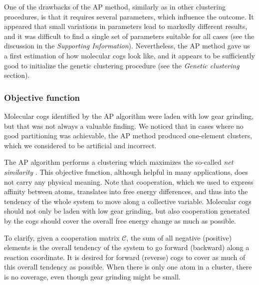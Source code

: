 \documentclass[a4paper,11pt,twoside]{book}%
\begin{document}
One of the drawbacks of the AP method, similarly as in other clustering procedures, is that it requires several parameters, which influence the outcome.
It appeared that small variations in parameters lead to markedly different results, and it was difficult to find a single set of parameters suitable for all cases (see the discussion in the \emph{Supporting Information}).
Nevertheless, the AP method gave us a first estimation of how molecular cogs look like, and it appears to be sufficiently good to initialize the genetic clustering procedure (see the \emph{Genetic clustering} section).

\subsubsection{Objective function}\label{sec:objective}
Molecular cogs identified by the AP algorithm were laden with low gear grinding, but that was not always a valuable finding. 
We noticed that in cases where no good partitioning was achievable, the AP method produced one-element clusters, which we considered to be artificial and incorrect. 

The AP algorithm performs a clustering which maximizes the so-called \emph{net similarity} \cite{frey2007clustering}.
This objective function, although helpful in many applications, does not carry any physical meaning.
Note that cooperation, which we used to express affinity between atoms, translates into free energy differences, and thus into the tendency of the whole system to move along a collective variable.
Molecular cogs should not only be laden with low gear grinding, but also cooperation generated by the cogs should cover the overall free energy change as {\color{black}much} as possible.

To clarify, given a cooperation matrix $\mathcal{C}$, the sum of all negative (positive) elements is the overall tendency of the system to go forward (backward) along a reaction coordinate.
It is desired for forward (reverse) cogs to cover as much of this overall tendency as possible.
When there is only one atom in a cluster, there is no coverage, even though gear grinding might be small.
\end{document}
